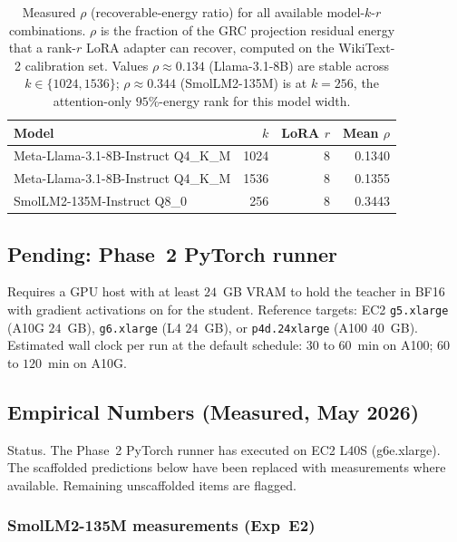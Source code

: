 \documentclass[11pt]{article}
\begin{document}
\begin{table}[h]\centering\small
\caption{Measured $\rho$ (recoverable-energy ratio) for all available
model-$k$-$r$ combinations.  $\rho$ is the fraction of the
GRC projection residual energy that a rank-$r$ LoRA adapter can
recover, computed on the WikiText-2 calibration set.  Values
$\rho\approx0.134$ (Llama-3.1-8B) are stable across $k\in\{1024,1536\}$;
$\rho\approx0.344$ (SmolLM2-135M) is at $k{=}256$, the attention-only
$95\%$-energy rank for this model width.}
\label{tab:rho-measured}
\begin{tabular}{@{}lrrr@{}}
\toprule
Model & $k$ & LoRA $r$ & Mean $\rho$ \\
\midrule
Meta-Llama-3.1-8B-Instruct Q4\_K\_M & 1024 & 8 & 0.1340 \\
Meta-Llama-3.1-8B-Instruct Q4\_K\_M & 1536 & 8 & 0.1355 \\
SmolLM2-135M-Instruct Q8\_0         & 256  & 8 & 0.3443 \\
\bottomrule
\end{tabular}
\end{table}

\subsection{Pending: Phase~2 PyTorch runner}
Requires a GPU host with at least $24$~GB VRAM to hold the teacher in
BF16 with gradient activations on for the student. Reference targets:
EC2 \texttt{g5.xlarge} (A10G $24$~GB), \texttt{g6.xlarge} (L4 $24$~GB),
or \texttt{p4d.24xlarge} (A100 $40$~GB). Estimated wall clock per run
at the default schedule: $30$ to $60$~min on A100; $60$ to $120$~min on
A10G.

\subsection{Empirical Numbers (Measured, May 2026)}
\label{sec:empirical-numbers}

Status.  The Phase~2 PyTorch runner has executed on EC2 L40S
(g6e.xlarge).  The scaffolded predictions below have been replaced with
measurements where available.  Remaining unscaffolded items are flagged.

\subsubsection{SmolLM2-135M measurements (Exp~E2)}
\end{document}
